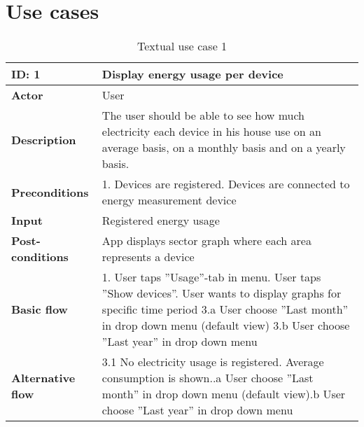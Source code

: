\chapter{Use cases}
\label{sec:textUseCase}
\begin{table}[H]
\begin{tabular}{|l|p{11.7cm}|}
\hline
\textbf{ID: }1&\textbf{Display energy usage per device}\\\hline
\textbf{Actor} &User\\\hline
\textbf{Description}&
The user should be able to see how much electricity each device in his house use on an average basis, on a monthly basis and on a yearly basis.\\\hline
\textbf{Preconditions}&
1. Devices are registered\newline
2. Devices are connected to energy measurement device\\\hline
\textbf{Input}&
Registered energy usage\\\hline
\textbf{Post-conditions}& App displays sector graph where each area represents a device\\\hline
\textbf{Basic flow}&
1. User taps ''Usage''-tab in menu\newline
2. User taps ''Show devices''\newline
3. User wants to display graphs for specific time period\newline
3.a User choose ''Last month'' in drop down menu (default view)\newline
3.b User choose ''Last year'' in drop down menu\\\hline
\textbf{Alternative flow}&
3.1 No electricity usage is registered. Average consumption is shown.\newline
3.1.a User choose ''Last month'' in drop down menu (default view)\newline
3.1.b User choose ''Last year'' in drop down menu\\\hline
\end{tabular}
\caption{Textual use case 1}
\end{table}

